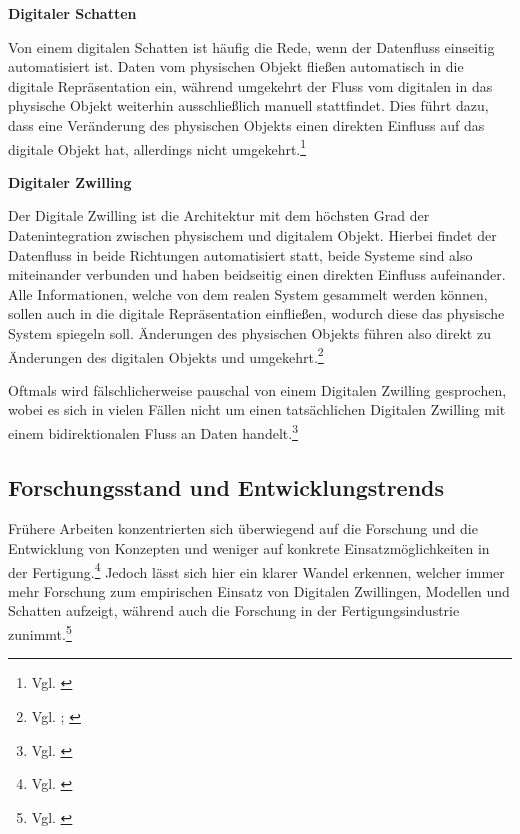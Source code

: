 \textbf{Digitaler Schatten}

Von einem digitalen Schatten ist häufig die Rede, wenn der Datenfluss einseitig automatisiert ist. Daten vom physischen Objekt fließen automatisch in die digitale Repräsentation ein, während umgekehrt der Fluss vom digitalen in das physische Objekt weiterhin ausschließlich manuell stattfindet. Dies führt dazu, dass eine Veränderung des physischen Objekts einen direkten Einfluss auf das digitale Objekt hat, allerdings nicht umgekehrt.\footnote{Vgl. \cite[S. 1017]{kritzinger_digital_2018}}

\textbf{Digitaler Zwilling}

Der Digitale Zwilling ist die Architektur mit dem höchsten Grad der Datenintegration zwischen physischem und digitalem Objekt. Hierbei findet der Datenfluss in beide Richtungen automatisiert statt, beide Systeme sind also miteinander verbunden und haben beidseitig einen direkten Einfluss aufeinander. Alle Informationen, welche von dem realen System gesammelt werden können, sollen auch in die digitale Repräsentation einfließen, wodurch diese das physische System spiegeln soll. Änderungen des physischen Objekts führen also direkt zu Änderungen des digitalen Objekts und umgekehrt.\footnote{Vgl. \cite[S. 1017]{kritzinger_digital_2018}; \cite[S. 108963]{fuller_digital_2020}}

Oftmals wird fälschlicherweise pauschal von einem Digitalen Zwilling gesprochen, wobei es sich in vielen Fällen nicht um einen tatsächlichen Digitalen Zwilling mit einem bidirektionalen Fluss an Daten handelt.\footnote{Vgl. \cite[S. 1020]{kritzinger_digital_2018}}

\subsection{Forschungsstand und Entwicklungstrends}
Frühere Arbeiten konzentrierten sich überwiegend auf die Forschung und die Entwicklung von Konzepten und weniger auf konkrete Einsatzmöglichkeiten in der Fertigung.\footnote{Vgl. \cite[S. 1018 ff.]{kritzinger_digital_2018}} Jedoch lässt sich hier ein klarer Wandel erkennen, welcher immer mehr Forschung zum empirischen Einsatz von Digitalen Zwillingen, Modellen und Schatten aufzeigt, während auch die Forschung in der Fertigungsindustrie zunimmt.\footnote{Vgl. \cite[S. 349]{liu_review_2021}}

